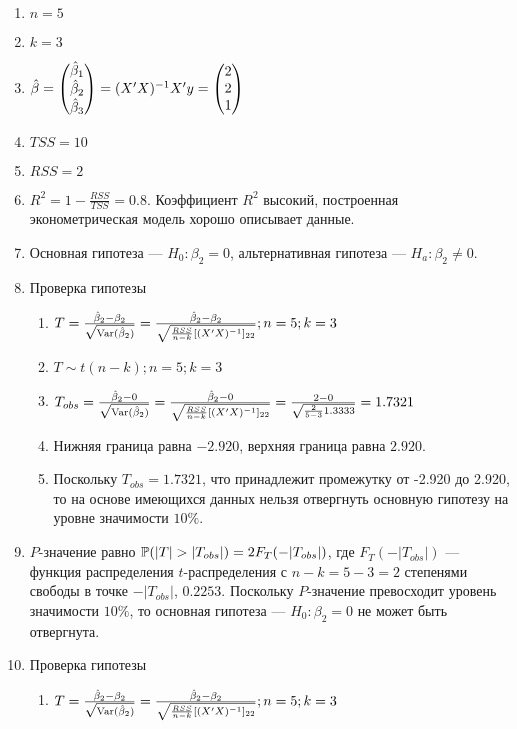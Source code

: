 \begin{problem}
\begin{sol}
\begin{enumerate}
\item $n = 5$
\item $k = 3$
\item $\hat{\beta} = \begin{pmatrix} \hat{\beta}_1 \\ \hat{\beta}_2 \\ \hat{\beta}_3 \end{pmatrix} = (X'X)^{-1}X'y = \begin{pmatrix} 2 \\ 2 \\ 1 \end{pmatrix}$
\item $TSS = 10$
\item $RSS = 2$
\item $R^2 = 1 - \frac {RSS}{TSS} = 0.8$. Коэффициент $R^2$ высокий, построенная эконометрическая модель хорошо описывает данные.
\item Основная гипотеза — $H_0: \beta_2 = 0$, альтернативная гипотеза — $H_a: \beta_2 \neq 0$.
\item Проверка гипотезы
\begin{enumerate}
\item $T = \frac{\hat{\beta}_2 - \beta_2}{\sqrt{\operatorname{Var}(\hat{\beta}_2)}} = \frac {\hat{\beta}_2 - \beta_2}{\sqrt{{\frac{RSS}{n-k}}[(X'X)^{-1}]_{22}}}; n = 5; k = 3$
\item $T \sim t(n-k); n = 5; k = 3$
\item $T_{obs} = \frac{\hat{\beta}_2 - 0}{\sqrt{\operatorname{Var}(\hat{\beta}_2)}} = \frac {\hat{\beta}_2 - 0}{\sqrt{{\frac{RSS}{n-k}}[(X'X)^{-1}]_{22}}} = \frac{2-0}{\sqrt{{\frac{2}{5-3}}1.3333}} = 1.7321$
\item Нижняя граница равна $-2.920$, верхняя граница равна $2.920$.
\item Поскольку $T_{obs} = 1.7321$, что принадлежит промежутку от -2.920 до 2.920, 
то на основе имеющихся данных нельзя отвергнуть основную гипотезу на уровне значимости $10\%$.
\end{enumerate}
\item $P$-значение равно $\P (|T|>|T_{obs}|) = 2F_{T}(-|T_{obs}|)$, 
где $F_{T}(-|T_{obs}|)$ — функция распределения $t$-распределения с $n - k = 5 - 3 = 2$ степенями свободы 
в точке $-|T_{obs}|$, $0.2253$. 
Поскольку $P$-значение превосходит уровень значимости $10\%$, 
то основная гипотеза — $H_0: \beta_2 = 0$ не может быть отвергнута.
\item Проверка гипотезы
\begin{enumerate}
\item $T = \frac{\hat{\beta}_2 - \beta_2}{\sqrt{\operatorname{Var}(\hat{\beta}_2)}} = \frac {\hat{\beta}_2 - \beta_2}{\sqrt{{\frac{RSS}{n-k}}[(X'X)^{-1}]_{22}}}; n = 5; k = 3$

\end{enumerate}
\end{enumerate}
\end{sol}
\end{problem}
